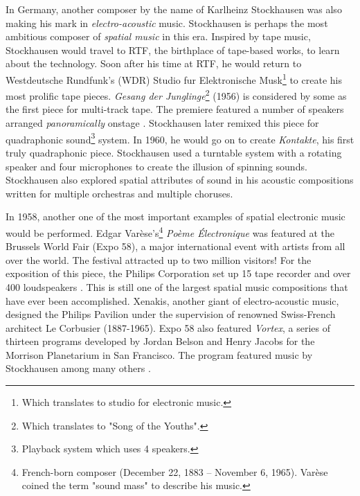 In Germany, another composer by the name of Karlheinz Stockhausen was also making his mark in \textit{electro-acoustic} music. Stockhausen is perhaps the most ambitious composer of \textit{spatial music} in this era. Inspired by tape music, Stockhausen would travel to RTF, the birthplace of tape-based works, to learn about the technology. Soon after his time at RTF, he would return to Westdeutsche Rundfunk's (WDR) Studio fur Elektronische Musk\footnote{Which translates to studio for electronic music.} to create his most prolific tape pieces. \textit{Gesang der Junglinge}\footnote{Which translates to "Song of the Youths".} (1956) is considered by some as the first piece for multi-track tape. The premiere featured a number of speakers arranged \textit{panoramically} onstage \cite{zvonar1999history}. Stockhausen later remixed this piece for quadraphonic sound\footnote{Playback system which uses 4 speakers.} system. In 1960, he would go on to create \textit{Kontakte}, his first truly quadraphonic piece. Stockhausen used a turntable system with a rotating speaker and four microphones to create the illusion of spinning sounds. Stockhausen also explored spatial attributes of sound in his acoustic compositions written for multiple orchestras and multiple choruses.


In 1958, another one of the most important examples of spatial electronic music would be performed. Edgar Varèse's\footnote{French-born composer (December 22, 1883 – November 6, 1965). Varèse coined the term "sound mass" to describe his music.} \textit{Poème Électronique} was featured at the Brussels World Fair (Expo 58), a major international event with artists from all over the world. The festival attracted up to two million visitors! For the exposition of this piece, the Philips Corporation set up 15 tape recorder and over 400 loudspeakers \cite{malham19953}. This is still one of the largest spatial music compositions that have ever been accomplished. Xenakis, another giant of electro-acoustic music, designed the Philips Pavilion under the supervision of renowned Swiss-French architect Le Corbusier (1887-1965). Expo 58 also featured \textit{Vortex}, a series of thirteen programs developed by Jordan Belson and Henry Jacobs for the Morrison Planetarium in San Francisco. The program featured music by Stockhausen among many others \cite{zvonar1999history}.

